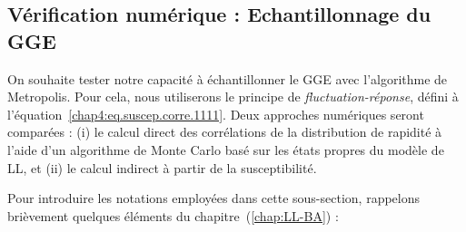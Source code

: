 \subsection{Vérification numérique : Echantillonnage du GGE}


On souhaite tester notre capacité à échantillonner le \gls{GGE} avec l’algorithme de Metropolis. 
Pour cela, nous utiliserons le principe de \emph{fluctuation-réponse}, défini à l’équation~\eqref{chap4:eq.suscep.corre.1111}. 
Deux approches numériques seront comparées : (i) le calcul direct des corrélations de la distribution de rapidité à l’aide d’un algorithme de Monte Carlo basé sur les états propres du modèle de \gls{LL}, et (ii) le calcul indirect à partir de la susceptibilité.

\medskip

Pour introduire les notations employées dans cette sous-section, rappelons brièvement quelques éléments du chapitre~(\ref{chap:LL-BA}) :  

\medskip

